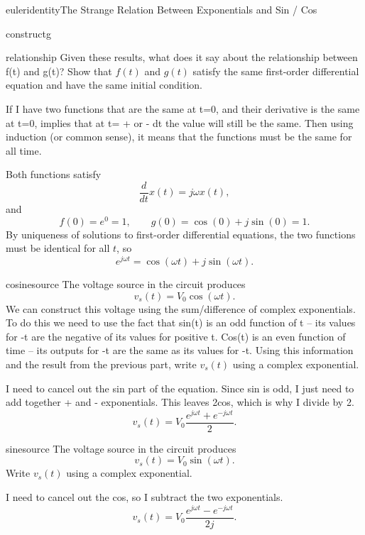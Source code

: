 \begin{mainquestion}{euleridentity}{The Strange Relation Between Exponentials and Sin / Cos}
\begin{partquestion}{constructg}
\qnewpage
\end{partquestion}

\begin{partquestion}{relationship}
{Given these results, what does it say about the relationship between f(t) and g(t)? Show that $f(t)$ and $g(t)$ satisfy the same first-order differential equation and have the same initial condition.}

\begin{answer}[2.5in]
If I have two functions that are the same at t=0, and their derivative is the same at t=0, implies that at t= + or - dt the value will still be the same.  Then using induction (or common sense), it means that the functions must be the same for all time.

Both functions satisfy
\[
\frac{d}{dt}x(t) = j\omega x(t),
\]
and
\[
f(0) = e^{0} = 1,
\qquad
g(0) = \cos(0) + j\sin(0) = 1.
\]
By uniqueness of solutions to first-order differential equations, the two functions must be identical for all $t$, so
\[
e^{j\omega t} = \cos(\omega t) + j\sin(\omega t).
\]
\end{answer}

\noindent
\end{partquestion}

\begin{partquestion}{cosinesource}
{The voltage source in the circuit produces
\[
v_s(t) = V_0 \cos(\omega t).
\]
We can construct this voltage using the sum/difference of complex exponentials.  To do this we need to use the fact that sin(t) is an odd function of t -- its values for -t are the negative of its values for positive t.  Cos(t) is an even function of time -- its outputs for -t are the same as its values for -t. Using this information and the result from the previous part, write $v_s(t)$ using a complex exponential.}

\begin{answer}[1.2in]
I need to cancel out the sin part of the equation.  Since sin is odd, I just need to add together + and - exponentials.  This leaves 2cos, which is why I divide by 2.
\[
v_s(t) =V_0\frac{e^{j\omega t}+e^{-j\omega t}}{2}.
\]
\end{answer}

\end{partquestion}

\begin{partquestion}{sinesource}
{The voltage source in the circuit produces
\[
v_s(t) = V_0 \sin(\omega t).
\]
Write $v_s(t)$ using a complex exponential.}

\begin{answer}[1.2in]
I need to cancel out the cos, so I subtract the two exponentials.
\[
v_s(t) =V_0\frac{e^{j\omega t}-e^{-j\omega t}}{2j}.
\]
\end{answer}

\end{partquestion}

\end{mainquestion}
